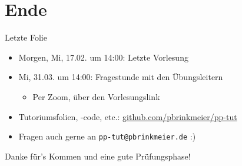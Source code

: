 \documentclass{beamer}
\begin{document}
\section{Ende}

\begin{frame}{Letzte Folie}
  \begin{itemize}
    \item Morgen, Mi, 17.02. um 14:00: Letzte Vorlesung
    \item Mi, 31.03. um 14:00: Fragestunde mit den Übungsleitern
    \begin{itemize}
      \item Per Zoom, über den Vorlesungslink
    \end{itemize}
    \item Tutoriumsfolien, -code, etc.: \href{https://github.com/pbrinkmeier/pp-tut}{github.com/pbrinkmeier/pp-tut}
    \item Fragen auch gerne an \texttt{pp-tut@pbrinkmeier.de} :)
  \end{itemize}

  \vfill

  Danke für's Kommen und eine gute Prüfungsphase!
\end{frame}
\end{document}

